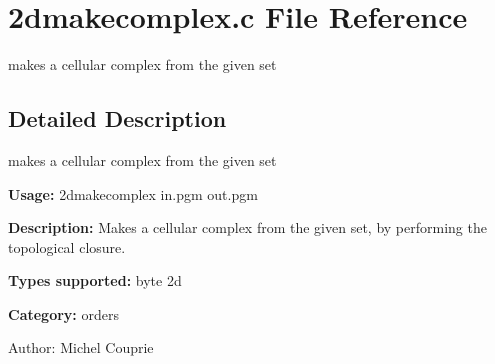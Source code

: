 \section{2dmakecomplex.c File Reference}
\label{2dmakecomplex_8c}
makes a cellular complex from the given set  




\label{_details}
\subsection{Detailed Description}
makes a cellular complex from the given set 

{\bf Usage:} 2dmakecomplex in.pgm out.pgm

{\bf Description:} Makes a cellular complex from the given set, by performing the topological closure.

{\bf Types supported:} byte 2d

{\bf Category:} orders

\begin{Desc}
\item[Author:]Michel Couprie \end{Desc}
